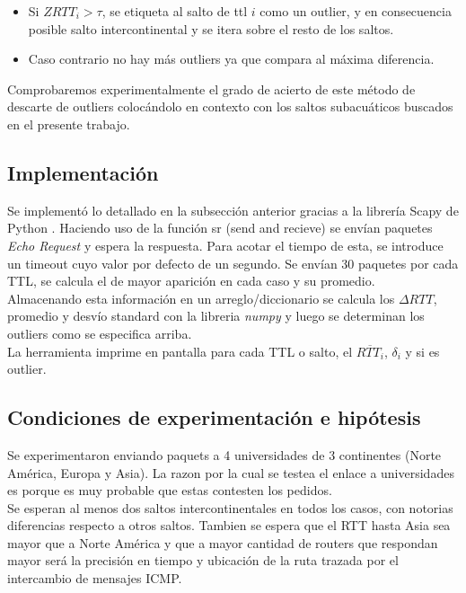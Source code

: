 \begin{itemize}
\item Si $ZRTT_{i} > \tau$, se etiqueta al salto de ttl $i$ como un outlier, y en consecuencia posible salto intercontinental y se itera sobre el resto de los saltos.
\item Caso contrario no hay más outliers ya que compara al máxima diferencia.
\end{itemize}

Comprobaremos experimentalmente el grado de acierto de este método de descarte de outliers colocándolo en contexto con los saltos subacuáticos buscados en el presente trabajo.\\


\subsection{Implementación}

Se implementó lo detallado en la subsección anterior gracias a la librería Scapy de Python \cite{Scapy}. Haciendo uso de la función sr (send and recieve) se envían paquetes \textit{Echo Request} y espera la respuesta. Para acotar el tiempo de esta, se introduce un timeout cuyo valor por defecto de un segundo. Se envían 30 paquetes por cada TTL, se calcula el de mayor aparición en cada caso y su promedio.\\

Almacenando esta información en un arreglo/diccionario se calcula los $\Delta RTT$, promedio y desvío standard con la libreria \textit{numpy} y luego se determinan los outliers como se especifica arriba.\\

La herramienta imprime en pantalla para cada TTL o salto, el $\overline{RTT_{i}}$, $\delta_{i}$ y si es outlier. 

\subsection{Condiciones de experimentación e hipótesis}

Se experimentaron enviando paquets a 4 universidades de 3 continentes (Norte América, Europa y Asia). La razon por la cual se testea el enlace a universidades es porque es muy probable que estas contesten los pedidos.\\

Se esperan al menos dos saltos intercontinentales en todos los casos, con notorias diferencias respecto a otros saltos. Tambien se espera que el RTT hasta Asia sea mayor que a Norte América y que a mayor cantidad de routers que respondan mayor será la precisión en tiempo y ubicación de la ruta trazada por el intercambio de mensajes ICMP.


